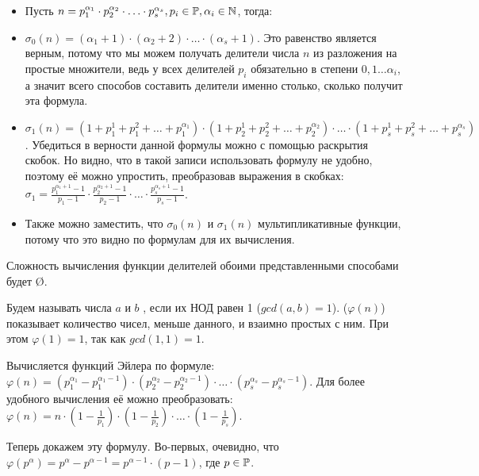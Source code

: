\begin{itemize}
    \item Пусть $n = p_1^{\alpha_1} \cdot p_2^{\alpha_2} \cdot \ldots \cdot p_s^{\alpha_s}, p_i \in \mathbb{P}, \alpha_i \in \mathbb{N}$, тогда:
    \item $\sigma_0(n) = (\alpha_1 + 1) \cdot (\alpha_2 + 2) \cdot \ldots \cdot (\alpha_s + 1)$. Это равенство является верным, потому что мы можем получать делители числа $n$ из разложения на простые множители, ведь у всех делителей $p_i$ обязательно в степени $0, 1 \ldots \alpha_i$, а значит всего способов составить делители именно столько, сколько получит эта формула.
    \item $\sigma_1(n) = (1 + p_1^1 + p_1^2 + \ldots + p_1^{\alpha_1}) \cdot (1 + p_2^1 + p_2^2 + \ldots + p_2^{\alpha_2}) \cdot \ldots \cdot (1 + p_s^1 + p_s^2 + \ldots + p_s^{\alpha_s})$. Убедиться в верности данной формулы можно с помощью раскрытия скобок. Но видно, что в такой записи использовать формулу не удобно, поэтому её можно упростить, преобразовав выражения в скобках: $\sigma_1 = \frac{p_1^{\alpha_1 + 1} - 1}{p_1 - 1} \cdot \frac{p_2^{\alpha_2 + 1} - 1}{p_2 - 1} \cdot \ldots \cdot \frac{p_s^{\alpha_s + 1} - 1}{p_s - 1}$.
    \item Также можно заместить, что $\sigma_0(n)$ и $\sigma_1(n)$ мультипликативные функции, потому что это видно по формулам для их вычисления.
\end{itemize}

Сложность вычисления функции делителей обоими представленными способами будет \O{}.


\hypertarget{euler_function}{}
Будем называть числа $a$ и $b$ , если их НОД равен 1 ($gcd(a, b) = 1$).  ($\varphi(n)$) показывает количество чисел, меньше данного, и взаимно простых с ним. При этом $\varphi(1) = 1$, так как $gcd(1, 1) = 1$.

Вычисляется функций Эйлера по формуле: $\varphi(n) = (p_1^{\alpha_1} - p_1^{\alpha_1 - 1}) \cdot (p_2^{\alpha_2} - p_2^{\alpha_2 - 1}) \cdot \ldots \cdot (p_s^{\alpha_s} - p_s^{\alpha_s - 1})$. Для более удобного вычисления её можно преобразовать: $\varphi(n) = n \cdot (1 - \frac{1}{p_1}) \cdot (1 - \frac{1}{p_2}) \cdot \ldots \cdot (1 - \frac{1}{p_s})$.

Теперь докажем эту формулу. Во-первых, очевидно, что $\varphi(p^\alpha) = p^{\alpha} - p^{\alpha - 1} = p^{\alpha - 1} \cdot (p - 1)$, где $p \in \mathbb{P}$.

